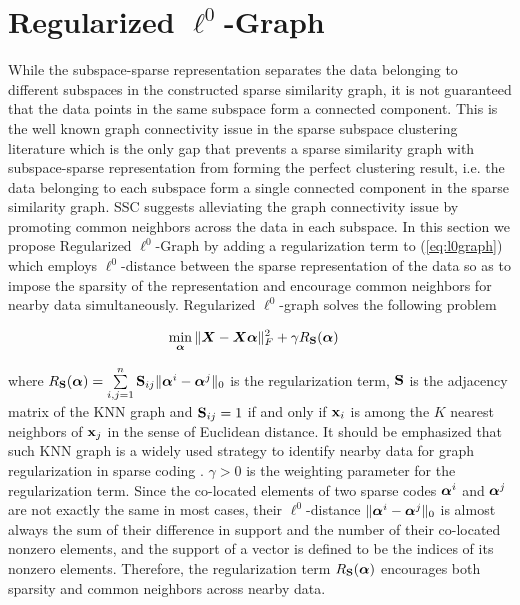 \documentclass[10pt,twocolumn,letterpaper]{article}
\begin{document}
\section{Regularized $\ell^{0}$-Graph}
While the subspace-sparse representation separates the data belonging to different subspaces in the constructed sparse similarity graph, it is not guaranteed that the data points in the same subspace form a connected component. This is the well known graph connectivity issue in the sparse subspace clustering literature \cite{ElhamifarV13,Nasihatkon11} which is the only gap that prevents a sparse similarity graph with subspace-sparse representation from forming the perfect clustering result, i.e. the data belonging to each subspace form a single connected component in the sparse similarity graph. SSC \cite{ElhamifarV13} suggests alleviating the graph connectivity issue by promoting common neighbors across the data in each subspace. In this section we propose Regularized $\ell^{0}$-Graph by adding a regularization term to (\ref{eq:l0graph}) which employs $\ell^{0}$-distance between the sparse representation of the data so as to impose the sparsity of the representation and encourage common neighbors for nearby data simultaneously. Regularized $\ell^{0}$-graph solves the following problem
\begin{small}
\begin{align}\label{eq:rl0graph}
&\mathop {\min }\limits_{\bm{\alpha}} \|{\bm X} - {\bm X}\bm{\alpha}\|_F^2 + \gamma  R_{\mathbf{S}}(\bm{\alpha})
\end{align}
\end{small}
where $R_{\mathbf{S}}(\bm{\alpha}) = \sum\limits_{i,j=1}^n {\mathbf{S}_{ij} \|\bm{\alpha}^i - \bm{\alpha}^j\|_0  }$ is the regularization term, $\mathbf{S}$ is the adjacency matrix of the KNN graph and $\mathbf{S}_{ij} = 1$ if and only if $\mathbf{x}_i$ is among the $K$ nearest neighbors of $\mathbf{x}_j$ in the sense of Euclidean distance. It should be emphasized that such KNN graph is a widely used strategy to identify nearby data for graph regularization in sparse coding \cite{Zheng11,YYZRl1graphBMVC2014}. $\gamma>0$ is the weighting parameter for the regularization term. Since the co-located elements of two sparse codes $\bm{\alpha}^i$ and $\bm{\alpha}^j$ are not exactly the same in most cases, their $\ell^{0}$-distance $\|\bm{\alpha}^i - \bm{\alpha}^j\|_0$ is almost always the sum of their difference in support and the number of their co-located nonzero elements, and the support of a vector is defined to be the indices of its nonzero elements. Therefore, the regularization term $R_{\mathbf{S}}(\bm{\alpha})$ encourages both sparsity and common neighbors across nearby data.
\end{document}
